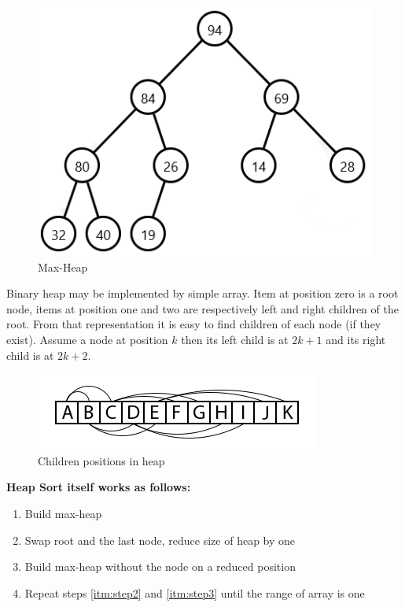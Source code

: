 \documentclass[
  field=inf,
  biblatex,
  language=english,
  glossaries,
  theorems=false,
  index
]{kidiplom}
\begin{document}
\begin{figure}[H]
\begin{center}
	
	\includegraphics[scale=0.7]{img/Maxheap.png}
	\caption{Max-Heap}\label{fig:maxheap}
\end{center}
\end{figure}

Binary heap may be implemented by simple array. Item at position zero is a root node, items at position one and two are respectively left and right children of the root. From that representation it is easy to find children of each node (if they exist). Assume a node at position $k$ then its left child is at $2k + 1$ and its right child is at $2k + 2$.

\begin{figure}[H]
\begin{center}
	
	\includegraphics[scale=3]{img/Heapsort.png}
	\caption{Children positions in heap}\label{fig:heapsort}
\end{center}
\end{figure}

\textbf{Heap Sort itself works as follows:}
\begin{enumerate}
 \item \label{itm:step1} Build max-heap
 \item \label{itm:step2} Swap root and the last node, reduce size of heap by one
 \item \label{itm:step3} Build max-heap without the node on a reduced position
 \item Repeat steps \ref{itm:step2} and \ref{itm:step3} until the range of array is one
\end{enumerate}
\end{document}
